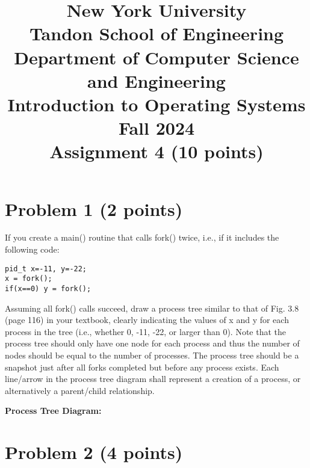 \documentclass{article}
\begin{document}
\title{New York University \\ Tandon School of Engineering \\ Department of Computer Science and Engineering \\ Introduction to Operating Systems \\ Fall 2024 \\ Assignment 4 (10 points)}
\maketitle

\section*{Problem 1 (2 points)}

If you create a main() routine that calls fork() twice, i.e., if it includes the following code:

\texttt{pid\_t x=-11, y=-22;} \\
\texttt{x = fork();}\\
\texttt{if(x==0) y = fork(); }

Assuming all fork() calls succeed, draw a process tree similar to that of Fig. 3.8 (page 116) in your textbook, clearly indicating the values of x and y for each process in the tree (i.e., whether 0, -11, -22, or larger than 0). Note that the process tree should only have one node for each process and thus the number of nodes should be equal to the number of processes. The process tree should be a snapshot just after all forks completed but before any process exists. Each line/arrow in the process tree diagram shall represent a creation of a process, or alternatively a parent/child relationship.

\textbf{Process Tree Diagram:}

\begin{center}
\end{center}


\section*{Problem 2 (4 points)}
\end{document}
